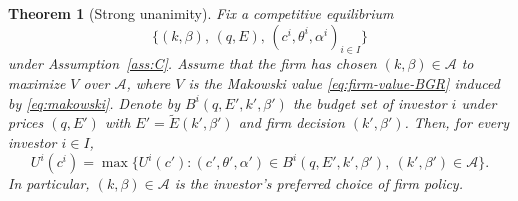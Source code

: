 \documentclass[11pt,a4paper,oneside]{book}
\theoremstyle{plain}
\newtheorem{theorem}{Theorem}[chapter]
\theoremstyle{definition}
\theoremstyle{remark}
\numberwithin{equation}{chapter}
\begin{document}
\begin{theorem}[Strong unanimity]\label{thm:strong-unanimity-BGR}
Fix a competitive equilibrium
\begin{equation*}
  \bigl\{ (k, \beta), \, (q, E), \, (c^i, \theta^i, \alpha^i)_{i \in I} \bigr\}
\end{equation*}
under Assumption~\ref{ass:C}.
Assume that the firm has chosen $(k, \beta) \in \mathcal{A}$ to maximize $V$ over $\mathcal{A}$, where $V$ is the Makowski value \eqref{eq:firm-value-BGR} induced by \eqref{eq:makowski}.
Denote by $B^i(q, E', k', \beta')$ the budget set of investor $i$ under prices $(q, E')$ with $E' = \widetilde{E}(k', \beta')$ and firm decision $(k', \beta')$.
Then, for every investor $i \in I$,
\begin{equation}\label{eq:strong-unanimity-BGR}
  U^i(c^i) = \max \bigl\{ U^i(c') \colon (c', \theta', \alpha') \in B^i(q, E', k', \beta'), \ (k', \beta') \in \mathcal{A} \bigr\}.
\end{equation}
In particular, $(k, \beta) \in \mathcal{A}$ is the investor's preferred choice of firm policy.
\end{theorem}
\end{document}
